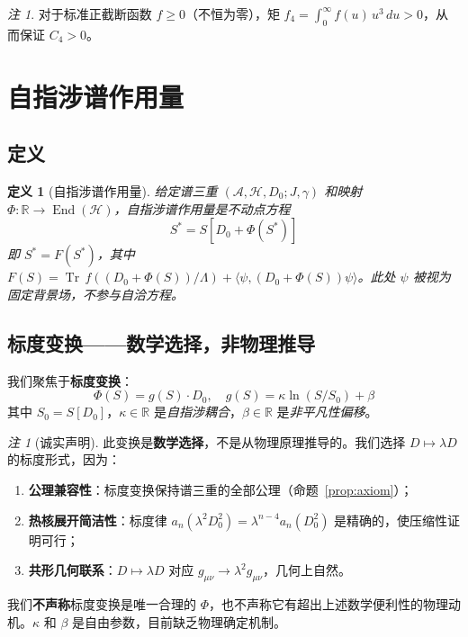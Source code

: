 \documentclass[11pt,a4paper]{ctexart}
\newtheorem{definition}[theorem]{定义}
\theoremstyle{remark}
\newtheorem{remark}[theorem]{注}
\providecommand{\Tr}{\operatorname{Tr}}
\newcommand{\End}{\operatorname{End}}
\begin{document}
\begin{remark}
对于标准正截断函数 $f \geq 0$（不恒为零），矩 $f_4 = \int_0^\infty f(u)\, u^3\, du > 0$，从而保证 $C_4 > 0$。
\end{remark}

\section{自指涉谱作用量}

\subsection{定义}

\begin{definition}[自指涉谱作用量]
给定谱三重 $(\mathcal{A}, \mathcal{H}, D_0; J, \gamma)$ 和映射 $\Phi: \mathbb{R} \to \End(\mathcal{H})$，自指涉谱作用量是不动点方程
\[
  S^* = S[D_0 + \Phi(S^*)]
\]
即 $S^* = F(S^*)$，其中 $F(S) = \Tr\, f((D_0 + \Phi(S))/\Lambda) + \langle\psi, (D_0 + \Phi(S))\psi\rangle$。此处 $\psi$ 被视为固定背景场，不参与自洽方程。
\end{definition}

\subsection{标度变换——数学选择，非物理推导}

我们聚焦于\textbf{标度变换}：
\[
  \Phi(S) = g(S) \cdot D_0, \quad g(S) = \kappa \ln(S/S_0) + \beta
\]
其中 $S_0 = S[D_0]$，$\kappa \in \mathbb{R}$ 是\emph{自指涉耦合}，$\beta \in \mathbb{R}$ 是\emph{非平凡性偏移}。

\begin{remark}[诚实声明]
此变换是\textbf{数学选择}，不是从物理原理推导的。我们选择 $D \mapsto \lambda D$ 的标度形式，因为：
\begin{enumerate}
  \item \textbf{公理兼容性}：标度变换保持谱三重的全部公理（命题~\ref{prop:axiom}）；
  \item \textbf{热核展开简洁性}：标度律 $a_n(\lambda^2 D_0^2) = \lambda^{n-4} a_n(D_0^2)$ 是精确的，使压缩性证明可行；
  \item \textbf{共形几何联系}：$D \mapsto \lambda D$ 对应 $g_{\mu\nu} \to \lambda^2 g_{\mu\nu}$，几何上自然。
\end{enumerate}
我们\textbf{不声称}标度变换是唯一合理的 $\Phi$，也不声称它有超出上述数学便利性的物理动机。$\kappa$ 和 $\beta$ 是自由参数，目前缺乏物理确定机制。
\end{remark}
\end{document}

